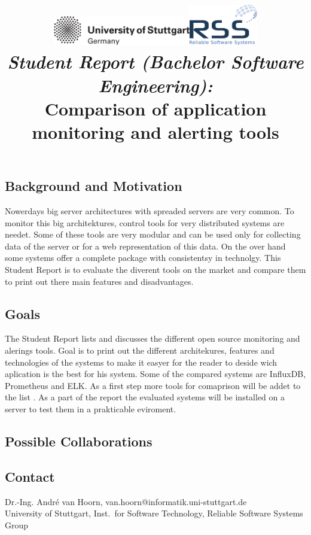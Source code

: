 \documentclass[a4paper,12pt]{article}
\date{}
\title{
\includegraphics[width=6cm]{figures/stuttgart-vector.pdf}\hfill{\includegraphics[width=3cm]{figures/rss_logo.pdf}}
\quad \\ [0.5cm]
{\large \textit{Student Report (Bachelor Software Engineering):}} \\ [1mm]
{\Large Comparison of application monitoring and alerting tools}
}
\begin{document}
	

\maketitle

\thispagestyle{empty}

\vspace{-2.5cm}


\subsection*{Background and Motivation}
Nowerdays big server architectures with spreaded servers are very common. To monitor this big architektures, control tools for very distributed systems are needet. Some of these tools are very modular and can be used only for collecting data of the server or for a web representation of this data. On the over hand some systems offer a complete package with consistentsy in technolgy.\cite{Heger2017}
This Student Report is to evaluate the diverent tools on the market and compare them to print out there main features and disadvantages.

\subsection*{Goals}
The Student Report lists and discusses the different open source monitoring and alerings tools. Goal is to print out the different architekures, features and technologies of the systems to make it easyer for the reader to deside wich aplication is the best for his system.
Some of the compared systems are InfluxDB, Prometheus and ELK. As a first step more tools for comaprison will be addet to the list .
As a part of the report the evaluated systems will be installed on a server to test them in a prakticable eviroment.

\subsection*{Possible Collaborations}


\begin{scriptsize}


\end{scriptsize}

\subsection*{Contact}
Dr.-Ing. André van Hoorn, van.hoorn@informatik.uni-stuttgart.de \\
University of Stuttgart, Inst.\ for Software Technology, Reliable Software Systems Group \\
\end{document}
